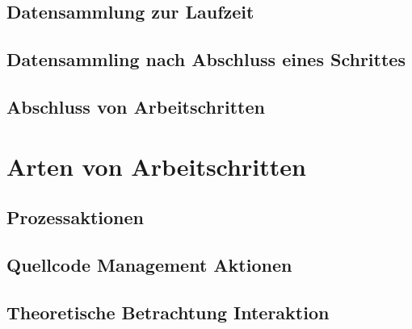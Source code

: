 \subsection{Datensammlung zur Laufzeit}
\subsection{Datensammling nach Abschluss eines Schrittes}
\subsection{Abschluss von Arbeitschritten}


\section{Arten von Arbeitschritten}
\subsection{Prozessaktionen}
\subsection{Quellcode Management Aktionen}
\subsection{Theoretische Betrachtung Interaktion}
